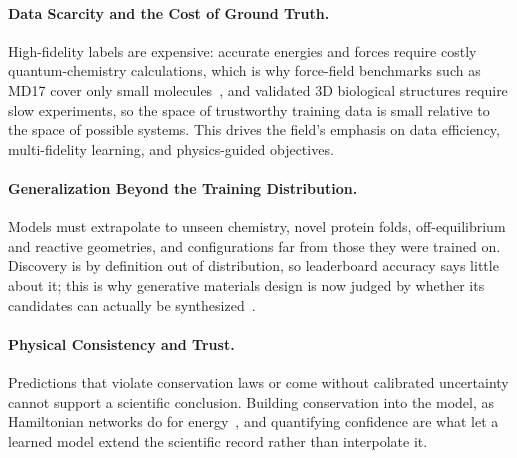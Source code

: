 \paragraph{Data Scarcity and the Cost of Ground Truth.} High-fidelity labels are expensive: accurate energies and forces require costly quantum-chemistry calculations, which is why force-field benchmarks such as MD17 cover only small molecules~\cite{chmiela2017machine}, and validated 3D biological structures require slow experiments, so the space of trustworthy training data is small relative to the space of possible systems. This drives the field's emphasis on data efficiency, multi-fidelity learning, and physics-guided objectives.

\paragraph{Generalization Beyond the Training Distribution.} Models must extrapolate to unseen chemistry, novel protein folds, off-equilibrium and reactive geometries, and configurations far from those they were trained on. Discovery is by definition out of distribution, so leaderboard accuracy says little about it; this is why generative materials design is now judged by whether its candidates can actually be synthesized~\cite{zeni2025generative}.

\paragraph{Physical Consistency and Trust.} Predictions that violate conservation laws or come without calibrated uncertainty cannot support a scientific conclusion. Building conservation into the model, as Hamiltonian networks do for energy~\cite{greydanus2019hamiltonian}, and quantifying confidence are what let a learned model extend the scientific record rather than interpolate it.
